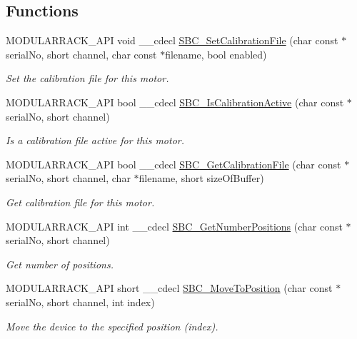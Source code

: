 \subsection*{Functions}
\begin{DoxyCompactItemize}
\item 
M\+O\+D\+U\+L\+A\+R\+R\+A\+C\+K\+\_\+\+A\+PI void \+\_\+\+\_\+cdecl \hyperlink{group___modular_stepper_gafb58e9857e0d6bd940abeed5f478cd82}{S\+B\+C\+\_\+\+Set\+Calibration\+File} (char const $\ast$serial\+No, short channel, char const $\ast$filename, bool enabled)
\begin{DoxyCompactList}\small\item\em Set the calibration file for this motor. \end{DoxyCompactList}\item 
M\+O\+D\+U\+L\+A\+R\+R\+A\+C\+K\+\_\+\+A\+PI bool \+\_\+\+\_\+cdecl \hyperlink{group___modular_stepper_ga32f6aceb018232ec4a0f913a3555c92a}{S\+B\+C\+\_\+\+Is\+Calibration\+Active} (char const $\ast$serial\+No, short channel)
\begin{DoxyCompactList}\small\item\em Is a calibration file active for this motor. \end{DoxyCompactList}\item 
M\+O\+D\+U\+L\+A\+R\+R\+A\+C\+K\+\_\+\+A\+PI bool \+\_\+\+\_\+cdecl \hyperlink{group___modular_stepper_ga03e1bd41946eceff8aa1c42af39c5c74}{S\+B\+C\+\_\+\+Get\+Calibration\+File} (char const $\ast$serial\+No, short channel, char $\ast$filename, short size\+Of\+Buffer)
\begin{DoxyCompactList}\small\item\em Get calibration file for this motor. \end{DoxyCompactList}\item 
M\+O\+D\+U\+L\+A\+R\+R\+A\+C\+K\+\_\+\+A\+PI int \+\_\+\+\_\+cdecl \hyperlink{group___modular_stepper_gab2bfa12030d815309d2769ab353580a0}{S\+B\+C\+\_\+\+Get\+Number\+Positions} (char const $\ast$serial\+No, short channel)
\begin{DoxyCompactList}\small\item\em Get number of positions. \end{DoxyCompactList}\item 
M\+O\+D\+U\+L\+A\+R\+R\+A\+C\+K\+\_\+\+A\+PI short \+\_\+\+\_\+cdecl \hyperlink{group___modular_stepper_ga664fb4f4f50643de30e26dce906fc878}{S\+B\+C\+\_\+\+Move\+To\+Position} (char const $\ast$serial\+No, short channel, int index)
\begin{DoxyCompactList}\small\item\em Move the device to the specified position (index). \end{DoxyCompactList}\item 

\end{DoxyCompactItemize}
